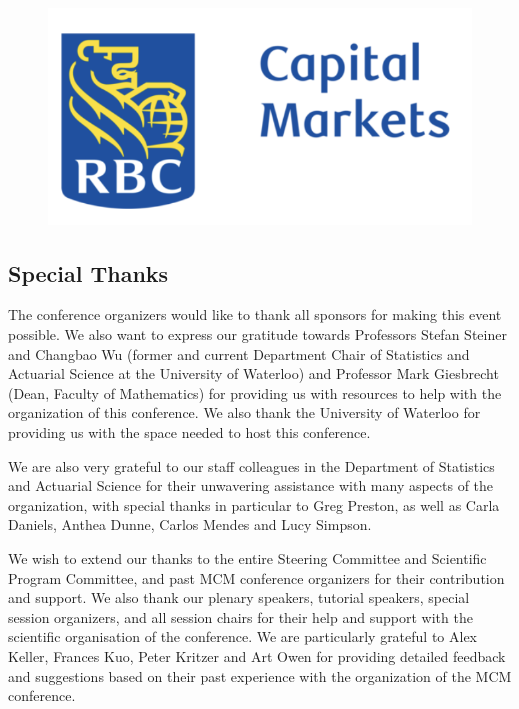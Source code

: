 \begin{figure}[ht]
\hfill
\includegraphics[scale =0.5]{RBC.png}
\end{figure}

\bigskip
\bigskip
\bigskip
% 

\clearpage
\subsection{Special Thanks}

The conference organizers would like to thank all sponsors for making this
event possible. We also want to express our gratitude towards 
Professors Stefan Steiner and Changbao Wu (former and current Department Chair of Statistics and Actuarial Science at the University of Waterloo) and Professor Mark Giesbrecht (Dean, Faculty of Mathematics) for providing us with resources to help with the organization of this conference. We also thank the University of Waterloo for providing us with the space needed to host this conference.


We are also very grateful to our staff colleagues in the Department of Statistics and Actuarial Science for their unwavering assistance with many aspects of the organization, with special thanks in particular to Greg Preston, as well as Carla Daniels, Anthea Dunne, Carlos Mendes and Lucy Simpson.


We wish to extend our thanks to the entire Steering Committee and
Scientific Program Committee, and past MCM conference organizers for their
contribution and support. We also thank our plenary speakers, tutorial
speakers, special session organizers, and all session chairs for their
help and support with the scientific organisation of the conference. We are particularly grateful to Alex Keller, Frances Kuo, Peter Kritzer and  Art Owen for providing detailed feedback and suggestions based on their past experience with the organization of the MCM conference.

